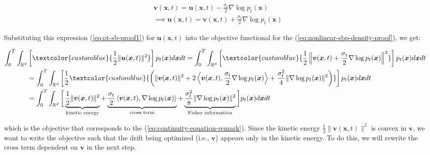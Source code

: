 \documentclass{article}
\newcommand{\bluetext}[1]{\textcolor{customblue}{#1}}
\begin{document}
\begin{small}
\begin{align}
    &\boldsymbol{v}(\boldsymbol{x},t)=\boldsymbol{u}(\boldsymbol{x},t)-\frac{\sigma_t}{2}\nabla \log p_t(\boldsymbol{x})\nonumber\\
    &\implies\boldsymbol{u}(\boldsymbol{x},t)=\boldsymbol{v}(\boldsymbol{x},t)+\frac{\sigma_t}{2}\nabla \log p_t(\boldsymbol{x})\label{eq:ot-sb-proof1}
\end{align}
\end{small}
Substituting this expression (\ref{eq:ot-sb-proof1}) for $\boldsymbol{u}(\boldsymbol{x},t)$ into the objective functional for the (\ref{eq:nonlinear-sbp-density-proof}), we get:
\begin{small}
\begin{align}
    \int_0^T\int_{\mathbb{R}^d}&\left[\bluetext{\frac{1}{2}\|\boldsymbol{u}(\boldsymbol{x},t)\|^2}\right]p_t(\boldsymbol{x}) d\boldsymbol{x}dt=\int_0^T\int_{\mathbb{R}^d}\left[\bluetext{\frac{1}{2}\left\|\boldsymbol{v}(\boldsymbol{x},t)+\frac{\sigma_t}{2}\nabla \log p_t(\boldsymbol{x})\right\|^2}\right]p_t(\boldsymbol{x}) d\boldsymbol{x}dt\nonumber\\
    &=\int_0^T\int_{\mathbb{R}^d}\left[\frac{1}{2}\bluetext{\left(\|\boldsymbol{v}(\boldsymbol{x},t)\|^2+2\left\langle \boldsymbol{v}(\boldsymbol{x},t),\frac{\sigma_t}{2}\nabla\log p_t(\boldsymbol{x})\right\rangle+\frac{\sigma^2_t}{4}\|\nabla\log p_t(\boldsymbol{x})\|^2\right)}\right]p_t(\boldsymbol{x}) d\boldsymbol{x}dt\nonumber\\
    &=\int_0^T\int_{\mathbb{R}^d}\bigg[\underbrace{\frac{1}{2}\|\boldsymbol{v}(\boldsymbol{x},t)\|^2}_{\text{kinetic energy}}+\underbrace{\frac{\sigma_t}{2}\left\langle \boldsymbol{v}(\boldsymbol{x},t),\nabla\log p_t(\boldsymbol{x})\right\rangle}_{\text{cross term}}+\underbrace{\frac{\sigma^2_t}{8}\|\nabla\log p_t(\boldsymbol{x})\|^2}_{\text{Fisher information}}\bigg]p_t(\boldsymbol{x}) d\boldsymbol{x}dt\label{eq:ot-sb-proof5}
\end{align}
\end{small}
which is the objective that corresponds to the (\ref{eq:continuity-equation-remark}). Since the kinetic energy $\frac{1}{2}\|\boldsymbol{v}(\boldsymbol{x},t)\|^2$ is convex in $\boldsymbol{v}$, we want to write the objective such that the drift being optimized (i.e., $\boldsymbol{v}$) appears only in the kinetic energy. To do this, we will rewrite the cross term dependent on $\boldsymbol{v}$ in the next step.
\end{document}
